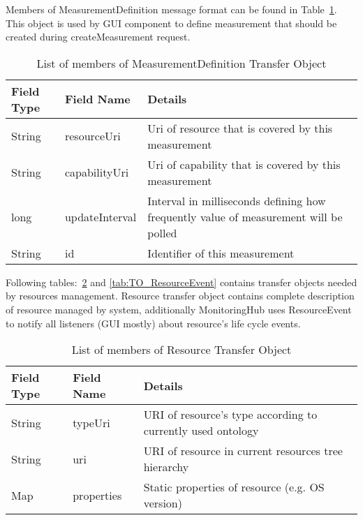 Members of MeasurementDefinition message format can be found in Table~\ref{tab:TO_MeasurementDef}. This object is used
by GUI component to define measurement that should be created during createMeasurement request.



\begin{table}[h] %
\begin{tabular}{| m{} | m{} | m{} |}
   \hline 
   \cellcolor[gray]{0.9} Field Type & \cellcolor[gray]{0.9} Field Name & \cellcolor[gray]{0.9} Details \\
   \hline 
   String  & resourceUri &  Uri of resource that is covered by this measurement \\
   String & capabilityUri & Uri of capability that is covered by this measurement \\
   long & updateInterval & Interval in milliseconds defining how frequently value of measurement will be polled \\
   String & id & Identifier of this measurement \\ 
   \hline 
\end{tabular}
 \caption{List of members of MeasurementDefinition Transfer Object}
 \label{tab:TO_MeasurementDef}
\end{table} %

Following tables:~\ref{tab:TO_Resource} and \ref{tab:TO_ResourceEvent} contains transfer objects needed by resources
management. Resource transfer object contains complete description of resource managed by system, additionally
MonitoringHub uses ResourceEvent to notify all listeners (GUI mostly) about resource's life cycle events.  

\begin{table}[h] %
\begin{tabular}{| m{} | m{} | m{} | }
   \hline 
   \cellcolor[gray]{0.9} Field Type & \cellcolor[gray]{0.9} Field Name & \cellcolor[gray]{0.9} Details \\
   \hline
   String & typeUri & URI of resource's type according to currently used ontology \\
   String & uri & URI of resource in current resources tree hierarchy \\
   Map & properties & Static properties of resource (e.g. OS version) \\
   \hline 
\end{tabular}
 \caption{List of members of Resource Transfer Object}
 \label{tab:TO_Resource}
\end{table} %



